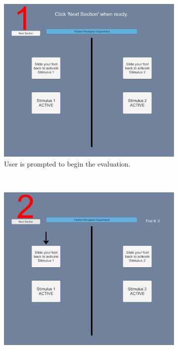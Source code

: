 \documentclass [12pt,letterpaper]{report}
\begin{document}
\begin{figure}[t!]
    \centering
    
    \begin{subfigure}[t]{0.5\textwidth}
        \centering
        \includegraphics[scale=0.215]{fig/perception_interface1}
        \caption{User is prompted to begin the evaluation.}
    \end{subfigure}%
    ~ 
    \begin{subfigure}[t]{0.5\textwidth}
        \centering
        \includegraphics[scale=0.215]{fig/perception_interface2}

\end{subfigure}
\end{figure}
\end{document}

